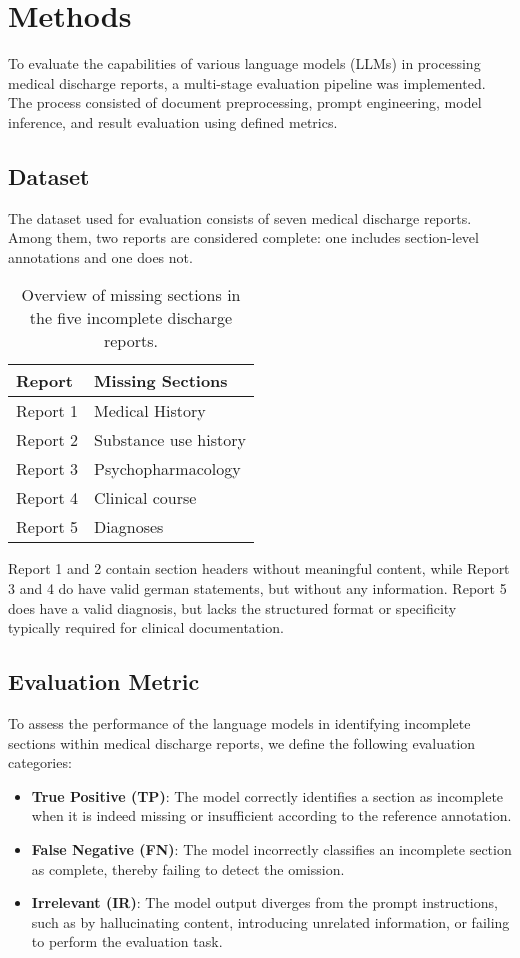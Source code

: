 \section{Methods}

To evaluate the capabilities of various language models (LLMs) in 
processing medical discharge reports, a multi-stage evaluation pipeline 
was implemented. The process consisted of document preprocessing, 
prompt engineering, model inference, and result evaluation using defined metrics.

\subsection{Dataset}
The dataset used for evaluation consists of seven medical discharge reports. 
Among them, two reports are considered complete: one includes section-level 
annotations and one does not. 
\begin{table}[H]
\centering
\begin{tabular}{l l}
\toprule
\textbf{Report} & \textbf{Missing Sections} \\
\midrule
Report 1 & Medical History \\
Report 2 & Substance use history \\
Report 3 & Psychopharmacology \\
Report 4 & Clinical course \\
Report 5 & Diagnoses \\
\bottomrule
\end{tabular}
\caption{Overview of missing sections in the five incomplete discharge reports.}
\label{tab:missing_sections}
\end{table}
Report 1 and 2 contain section headers without meaningful content, while Report 3 and 4 do have valid
german statements, but without any information. Report 5 does have a valid
diagnosis, but lacks the structured format or specificity typically required
for clinical documentation.

\subsection{Evaluation Metric}
To assess the performance of the language models in identifying incomplete sections within medical discharge reports, we define the following evaluation categories:
\begin{itemize}
  \item \textbf{True Positive (TP)}: The model correctly identifies a section as incomplete when it is indeed missing or insufficient according to the reference annotation.
  \item \textbf{False Negative (FN)}: The model incorrectly classifies an incomplete section as complete, thereby failing to detect the omission.
  \item \textbf{Irrelevant (IR)}: The model output diverges from the prompt instructions, such as by hallucinating content, introducing unrelated information, or failing to perform the evaluation task.
\end{itemize}

